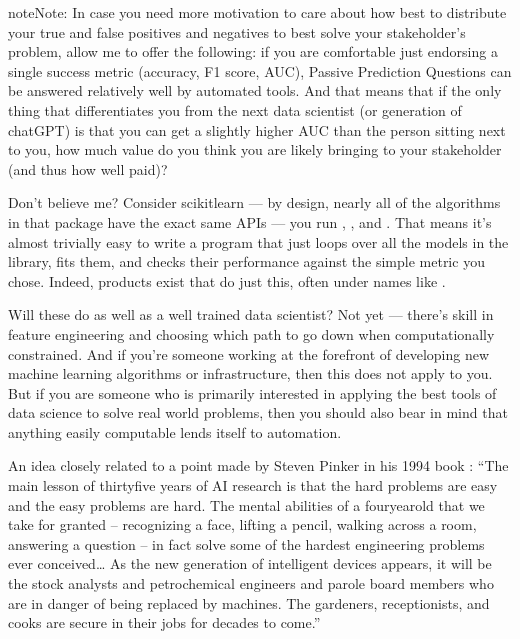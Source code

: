 \documentclass[letterpaper,10pt,english]{jupyterBook}
\begin{document}
\begin{sphinxadmonition}{note}{Note:}
\sphinxAtStartPar
In case you need more motivation to care about how best to distribute your true and false positives and negatives to best solve your stakeholder’s problem, allow me to offer the following: if you are comfortable just endorsing a single success metric (accuracy, F1 score, AUC),  Passive Prediction Questions can be answered relatively well by automated tools. And that means that if the only thing that differentiates you from the next data scientist (or generation of chatGPT) is that you can get a slightly higher AUC than the person sitting next to you, how much value do you think you are likely bringing to your stakeholder (and thus how well paid)?

\sphinxAtStartPar
Don’t believe me? Consider scikit\sphinxhyphen{}learn — by design, nearly all of the algorithms in that package have the exact same APIs — you run , , and . That means it’s almost trivially easy to write a program that just loops over all the models in the library, fits them, and checks their performance against the simple metric you chose. Indeed, products exist that do just this, often under names like .

\sphinxAtStartPar
Will these do as well as a well trained data scientist? Not yet — there’s skill in feature engineering and choosing which path to go down when computationally constrained. And if you’re someone working at the forefront of developing new machine learning algorithms or infrastructure, then this does not apply to you. But if you are someone who is primarily interested in applying the best tools of data science to solve real world problems, then you should also bear in mind that anything easily computable lends itself to automation.%
\begin{footnote}[1]\sphinxAtStartFootnote
An idea closely related to a point made by Steven Pinker in his 1994 book : “The main lesson of thirty\sphinxhyphen{}five years of AI research is that the hard problems are easy and the easy problems are hard. The mental abilities of a four\sphinxhyphen{}year\sphinxhyphen{}old that we take for granted – recognizing a face, lifting a pencil, walking across a room, answering a question – in fact solve some of the hardest engineering problems ever conceived… As the new generation of intelligent devices appears, it will be the stock analysts and petrochemical engineers and parole board members who are in danger of being replaced by machines. The gardeners, receptionists, and cooks are secure in their jobs for decades to come.”
%
\end{footnote}


\end{sphinxadmonition}
\end{document}
